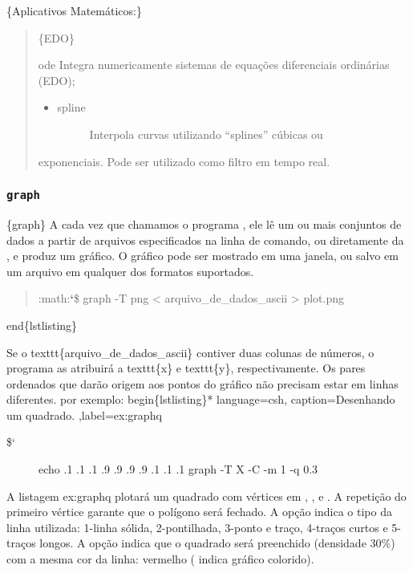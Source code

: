 \documentclass[a4paper,10pt,portuguese]{sphinxmanual}
\begin{document}
\{Aplicativos Matemáticos:\}
\begin{quote}

\{EDO\}

ode
Integra numericamente sistemas de equações diferenciais ordinárias
(EDO);
\begin{itemize}
\item {} \begin{description}
\item[{spline}] \leavevmode
Interpola curvas utilizando ``splines'' cúbicas ou

\end{description}

\end{itemize}

exponenciais. Pode ser utilizado como filtro em tempo real.
\end{quote}


\subsubsection{\texttt{graph}}
\label{bash:graph}
\{graph\} A cada vez que chamamos o programa , ele lê um ou
mais conjuntos de dados a partir de arquivos especificados na linha
de comando, ou diretamente da , e produz um gráfico. O
gráfico pode ser mostrado em uma janela, ou salvo em um arquivo em
qualquer dos formatos suportados.
\begin{quote}

:math:{\color{red}\bfseries{}{}`}\$ graph -T png \textless{} arquivo\_de\_dados\_ascii \textgreater{} plot.png
\end{quote}

end\{lstlisting\}

Se o texttt\{arquivo\_de\_dados\_ascii\} contiver duas colunas de números, o programa as atribuirá a texttt\{x\} e texttt\{y\}, respectivamente. Os pares ordenados que darão origem aos pontos do gráfico não precisam estar em linhas diferentes. por exemplo:
begin\{lstlisting\}* language=csh, caption=Desenhando um quadrado. ,label=ex:graphq
\begin{description}
\item[{\${}`}] \leavevmode
echo .1 .1 .1 .9 .9 .9 .9 .1 .1 .1 graph -T X -C -m 1 -q 0.3

\end{description}

A listagem ex:graphq plotará um quadrado com vértices em
, ,  e . A
repetição do primeiro vértice garante que o polígono será fechado.
A opção  indica o tipo da linha utilizada: 1-linha sólida,
2-pontilhada, 3-ponto e traço, 4-traços curtos e 5-traços longos. A
opção  indica que o quadrado será preenchido (densidade 30\%)
com a mesma cor da linha: vermelho ( indica gráfico
colorido).
\end{document}
